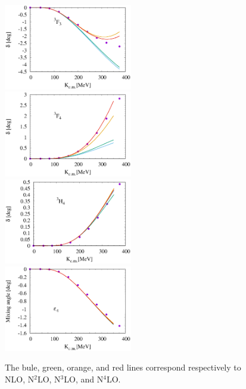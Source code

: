 \documentclass{article}
\begin{document}
\begin{figure}[htbp]
\includegraphics[width=0.5\textwidth]{5_3f3.eps}
\includegraphics[width=0.5\textwidth]{5_3f4.eps}
\includegraphics[width=0.5\textwidth]{5_3h4.eps}
\includegraphics[width=0.5\textwidth]{5_e4.eps}
\caption{The bule, green, orange, and red lines correspond respectively to NLO, N$^2$LO, N$^3$LO, and N$^4$LO. }
\end{figure}
\end{document}
